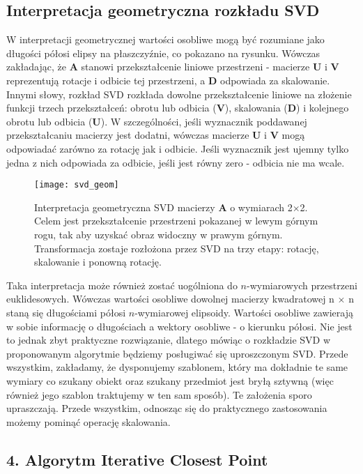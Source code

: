 \documentclass{article}
\begin{document}
\subsection*{\Large{Interpretacja geometryczna rozkładu SVD}} 

W interpretacji geometrycznej wartości osobliwe mogą być rozumiane jako długości półosi elipsy na płaszczyźnie, co pokazano na rysunku. Wówczas zakładając, że $\mathbf{A}$ stanowi przekształcenie liniowe przestrzeni - macierze $\mathbf{U}$ i $\mathbf{V}$ reprezentują rotacje i odbicie tej przestrzeni, a $\mathbf{D}$ odpowiada za skalowanie. Innymi słowy, rozkład SVD rozkłada dowolne przekształcenie liniowe na złożenie funkcji trzech przekształceń: obrotu lub odbicia ($\mathbf{V}$), skalowania ($\mathbf{D}$) i kolejnego obrotu lub odbicia ($\mathbf{U}$). W szczególności, jeśli wyznacznik poddawanej przekształcaniu macierzy jest dodatni, wówczas macierze $\mathbf{U}$ i $\mathbf{V}$ mogą odpowiadać zarówno za rotację jak i odbicie. Jeśli wyznacznik jest ujemny tylko jedna z nich odpowiada za odbicie, jeśli jest równy zero - odbicia nie ma wcale.

\begin{figure}[h]
\centering
\texttt{[image: svd\_geom]}
\caption{Interpretacja geometryczna SVD macierzy $\mathbf{A}$ o wymiarach 2$\times$2. Celem jest przekształcenie przestrzeni pokazanej w lewym górnym rogu, tak aby uzyskać obraz widoczny w prawym górnym. Transformacja zostaje rozłożona przez SVD na trzy etapy: rotację, skalowanie i ponowną rotację.}
\end{figure}

Taka interpretacja może również zostać uogólniona do $n$-wymiarowych przestrzeni euklidesowych. Wówczas wartości osobliwe dowolnej macierzy kwadratowej n $\times$ n staną się długościami półosi $n$-wymiarowej elipsoidy. Wartości osobliwe zawierają w sobie informację o długościach a wektory osobliwe - o kierunku półosi. Nie jest to jednak zbyt praktyczne rozwiązanie, dlatego mówiąc o rozkładzie SVD w proponowanym algorytmie będziemy posługiwać się uproszczonym SVD. Przede wszystkim, zakładamy, że dysponujemy szablonem, który ma dokładnie te same wymiary co szukany obiekt oraz szukany przedmiot jest bryłą sztywną (więc również jego szablon traktujemy w ten sam sposób). Te założenia sporo upraszczają. Przede wszystkim, odnosząc się do praktycznego zastosowania możemy pominąć operację skalowania.

\newpage
\subsection*{\LARGE{4. Algorytm Iterative Closest Point}} 
\end{document}
